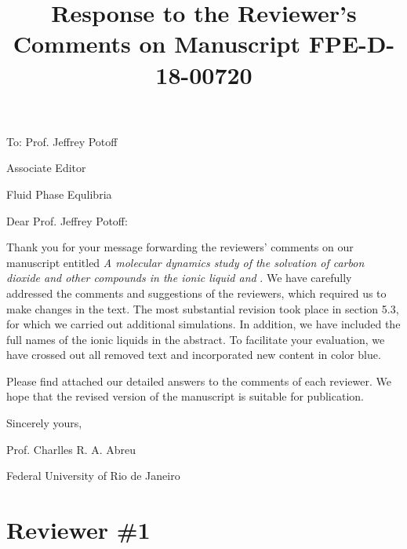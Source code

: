 \documentclass[]{article}
\title{\normalsize \textbf{Response to the Reviewer’s Comments on Manuscript FPE-D-18-00720}}
\author{}
\date{}
\begin{document}
\doublespacing
\maketitle

To: Prof. Jeffrey Potoff

Associate Editor

Fluid Phase Equlibria
\vspace{0.3cm}

Dear Prof. Jeffrey Potoff:

\hspace{0.5cm}Thank you for your message forwarding the reviewers’ comments on our manuscript entitled \textit{A molecular dynamics study of the solvation of carbon dioxide and other compounds in the ionic liquid \ce{[emim][B(CN)_4]} and \ce{[emim][NTf_2]}}.
We have carefully addressed the comments and suggestions of the reviewers, which required us to make changes in the text.
The most substantial revision took place in section 5.3, for which we carried out additional simulations.
In addition, we have included the full names of the ionic liquids in the abstract. To facilitate your evaluation, we have crossed out all removed text and incorporated new content in color blue.

\hspace{0.5cm}Please find attached our detailed answers to the comments of each reviewer. We
hope that the revised version of the manuscript is suitable for publication.

\hspace{0.5cm}Sincerely yours,
\vspace{0.5cm}

Prof. Charlles R. A. Abreu

Federal University of Rio de Janeiro

\section{\textbf{Reviewer \#1}}
{}
\end{document}
